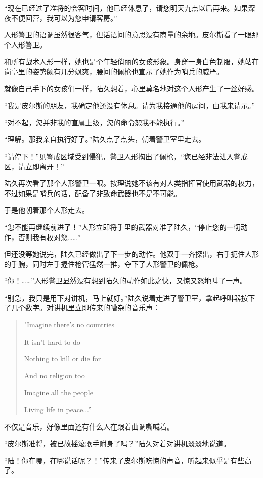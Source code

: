 “现在已经过了准将的会客时间，他已经休息了，请您明天九点以后再来。如果深夜不便回营，我可以为您申请客房。”

人形警卫的语调虽然很客气，但话语间的意思没有商量的余地。皮尔斯看了一眼那个人形警卫。

和所有战术人形一样，她也是个年轻俏丽的女孩形象。身穿一身白色制服，她站在岗亭里的姿势颇有几分飒爽，腰间的佩枪也宣示了她作为哨兵的威严。

就像自己手下的女孩们一样，陆久想着，心里莫名地对这个人形产生了一丝好感。

“我是皮尔斯的朋友，我确定他还没有休息。请为我接通他的房间，由我来请示。”

“对不起，您并非我的直属上级，您的命令恕我不能执行。”

“理解。那我亲自执行好了。”陆久点了点头，朝着警卫室里走去。

“请停下！”见警戒区域受到侵犯，警卫人形掏出了佩枪，“您已经非法进入警戒区，请立即离开！”

陆久再次看了那个人形警卫一眼。按理说她不该有对人类指挥官使用武器的权力，不过如果是哨兵的话，配备了非致命武器也不是不可能。

于是他朝着那个人形走去。

“您不能再继续前进了！”人形立即将手里的武器对准了陆久，“停止您的一切动作，否则我有权对您……”

但还没等她说完，陆久已经做出了下一步的动作。他双手一齐探出，右手扼住人形的手腕，同时左手握住枪管猛然一推，夺下了人形警卫的佩枪。

“你！……”人形警卫显然没有想到陆久的动作如此之快，又惊又怒地叫了一声。

“别急，我只是用下对讲机，马上就好。”陆久说着走进了警卫室，拿起呼叫器按下了几个数字。对讲机里立即传来的嘈杂的音乐声：

\begin{verse}
"Imagine there's no countries

It isn't hard to do

Nothing to kill or die for

And no religion too

Imagine all the people

Living life in peace...”
\end{verse}

不仅是音乐，好像里面还有什么人在跟着曲调嘶喊着。

“皮尔斯准将，被已故摇滚歌手附身了吗？”陆久对着对讲机淡淡地说道。

“陆！你在哪，在哪说话呢？！”传来了皮尔斯吃惊的声音，听起来似乎是有些高了。

